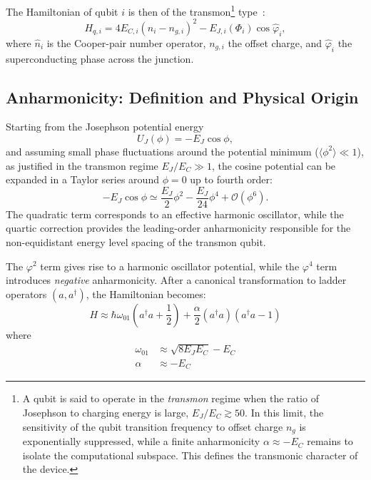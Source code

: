 The Hamiltonian of qubit $i$ is then of the transmon\footnote{A qubit is said to operate in the \emph{transmon} regime when the ratio of 
Josephson to charging energy is large, $E_J/E_C \gtrsim 50$. In this limit, the sensitivity of the qubit transition frequency to offset charge $n_g$ is exponentially suppressed, while a finite anharmonicity $\alpha \approx -E_C$ remains to isolate the computational subspace. This defines the transmonic character of the device.} type~\cite{Koch2007Transmon}:
\begin{equation}
H_{q,i} = 4E_{C,i}(\hat{n}_i-n_{g,i})^2 - E_{J,i}(\Phi_i)\cos\hat{\varphi}_i,
\label{eq:transmon_ham}
\end{equation}
where $\hat{n}_i$ is the Cooper-pair number operator, $n_{g,i}$ the offset charge, and $\hat{\varphi}_i$ the superconducting phase across the junction.

\subsection{Anharmonicity: Definition and Physical Origin}
Starting from the Josephson potential energy
\begin{equation}
U_J(\phi) = -E_J \cos\phi ,
\end{equation}
and assuming small phase fluctuations around the potential minimum
(\(\langle \phi^2 \rangle \ll 1\)), as justified in the transmon regime
\(E_J / E_C \gg 1\), the cosine potential can be expanded in a Taylor
series around \(\phi = 0\) up to fourth order:
\begin{equation}
- E_J \cos\phi \simeq
\frac{E_J}{2}\phi^2
- \frac{E_J}{24}\phi^4
+ \mathcal{O}(\phi^6).
\end{equation}
The quadratic term corresponds to an effective harmonic oscillator,
while the quartic correction provides the leading-order anharmonicity
responsible for the non-equidistant energy level spacing of the
transmon qubit.

The $\varphi^2$ term gives rise to a harmonic oscillator potential, while the $\varphi^4$ term introduces \emph{negative} anharmonicity. After a canonical transformation to ladder operators $(a, a^\dagger)$, the Hamiltonian becomes:
\begin{equation}
H \approx \hbar\omega_{01}\left(a^\dagger a + \frac{1}{2}\right) + \frac{\alpha}{2}(a^\dagger a)(a^\dagger a - 1)
\end{equation}
where
\begin{align}
\omega_{01} &\approx \sqrt{8E_J E_C} - E_C \label{eq:omega01} \\
\alpha &\approx -E_C \label{eq:alpha}
\end{align}

